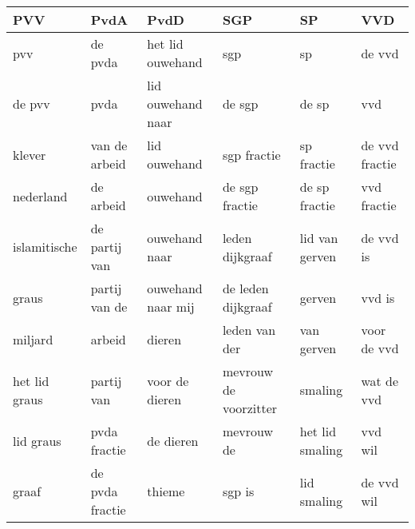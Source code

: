 \begin{tabular}{llllll}
\toprule
           PVV &             PvdA &               PvdD &                    SGP &               SP &             VVD \\
\midrule
           pvv &          de pvda &   het lid ouwehand &                    sgp &               sp &          de vvd \\
        de pvv &             pvda &  lid ouwehand naar &                 de sgp &            de sp &             vvd \\
        klever &    van de arbeid &       lid ouwehand &            sgp fractie &       sp fractie &  de vvd fractie \\
     nederland &        de arbeid &           ouwehand &         de sgp fractie &    de sp fractie &     vvd fractie \\
  islamitische &    de partij van &      ouwehand naar &        leden dijkgraaf &   lid van gerven &       de vvd is \\
         graus &    partij van de &  ouwehand naar mij &     de leden dijkgraaf &           gerven &          vvd is \\
       miljard &           arbeid &             dieren &          leden van der &       van gerven &     voor de vvd \\
 het lid graus &       partij van &     voor de dieren &  mevrouw de voorzitter &          smaling &      wat de vvd \\
     lid graus &     pvda fractie &          de dieren &             mevrouw de &  het lid smaling &         vvd wil \\
         graaf &  de pvda fractie &             thieme &                 sgp is &      lid smaling &      de vvd wil \\
\bottomrule
\end{tabular}
